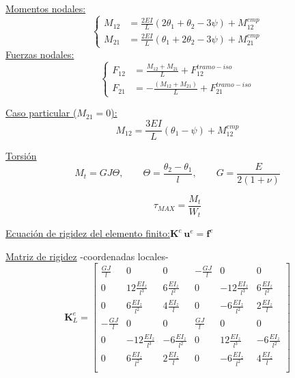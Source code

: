 \underline{Momentos nodales:}
$$
\left\{
\begin{array}{rl}
\displaystyle
M_{12} &=\frac{2 EI}{L} \left( 2 \theta_1  + \theta_2 - 3 \psi   \right)  +  M_{12}^{emp}  \\[3mm]
\displaystyle
M_{21} &=\frac{2 EI}{L} \left( \theta_1 + 2  \theta_2 - 3 \psi  \right)   +  M_{21}^{emp}
\end{array}
\right.
$$
\vspace{0.2cm}
\underline{Fuerzas nodales:}
$$
\left\{
\begin{array}{rl}
\displaystyle
F_{12} &= \frac{M_{12} + M_{21}}{L} + F_{12}^{tramo-iso} \\[3mm]
\displaystyle
F_{21} &= -\frac{(M_{12} + M_{21})}{L} + F_{21}^{tramo-iso} 
\end{array}
\right.
$$


\underline{Caso particular ($M_{21}=0$):}
$$
M_{12}=\frac{3EI}{L}\left( \theta_{1}-\psi \right) + M_{12}^{emp}
$$

\begin{center}
\end{center}

\underline{Torsión}
$$
M_t=GJ\Theta,
\qquad
\Theta=\frac{\theta_2 - \theta_1}{l},
\qquad
G=\frac{E}{2(1+\nu)}
$$


$$
\tau_{MAX}=\frac{M_t}{W_t}
$$


\vspace{0.2cm}
\begin{center}
	\def\svgwidth{0.65\textwidth}
	
\end{center}


\vspace{0.3cm}
\underline{Ecuación de rigidez del elemento finito:}\quad $ \textbf{K}^e \, \textbf{u}^e=\textbf{f}^e$

\vspace{0.3cm}
\underline{Matriz de rigidez} -coordenadas locales-
\renewcommand{\arraystretch}{1.35}
\[
\textbf{K}_L^e = 
\left[
\begin{matrix}
\frac{GJ}{l}  & 0 & 0 & -\frac{GJ}{l} & 0 & 0 \\
0  & 12\frac{EI_z}{l^3} & 6\frac{EI_z}{l^2} & 0  & -12\frac{EI_z}{l^3} & 6\frac{EI_z}{l^2} \\
0  & 6\frac{EI_z}{l^2} & 4\frac{EI_z}{l} & 0  & -6\frac{EI_z}{l^2} & 2\frac{EI_z}{l} \\
-\frac{GJ}{l}  & 0 & 0 & \frac{GJ}{l} & 0 & 0 \\
0  & -12\frac{EI_z}{l^3} & -6\frac{EI_z}{l^2} & 0  & 12\frac{EI_z}{l^3} & -6\frac{EI_z}{l^2} \\
0  & 6\frac{EI_z}{l^2} & 2\frac{EI_z}{l} & 0  & -6\frac{EI_z}{l^2} & 4\frac{EI_z}{l} \\
\end{matrix}
\right]
\]

